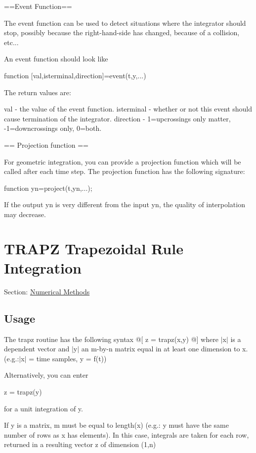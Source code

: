 ==Event Function==

The event function can be used to detect situations where the integrator should stop, possibly because the right-\/hand-\/side has changed, because of a collision, etc...

An event function should look like

function \mbox{[}val,isterminal,direction\mbox{]}=event(t,y,...)

The return values are\-:

val -\/ the value of the event function. isterminal -\/ whether or not this event should cause termination of the integrator. direction -\/ 1=upcrossings only matter, -\/1=downcrossings only, 0=both.

== Projection function ==

For geometric integration, you can provide a projection function which will be called after each time step. The projection function has the following signature\-: \begin{DoxyVerb}function yn=project(t,yn,...);
\end{DoxyVerb}


If the output yn is very different from the input yn, the quality of interpolation may decrease. \hypertarget{num_trapz}{}\section{T\-R\-A\-P\-Z Trapezoidal Rule Integration}\label{num_trapz}
Section\-: \hyperlink{sec_num}{Numerical Methods} \hypertarget{vtkwidgets_vtkxyplotwidget_Usage}{}\subsection{Usage}\label{vtkwidgets_vtkxyplotwidget_Usage}
The trapz routine has the following syntax @\mbox{[} z = trapz(x,y) @\mbox{]} where $|$x$|$ is a dependent vector and $|$y$|$ an m-\/by-\/n matrix equal in at least one dimension to x. (e.\-g.\-:$|$x$|$ = time samples, y = f(t))

Alternatively, you can enter \begin{DoxyVerb}     z = trapz(y) 
\end{DoxyVerb}
 for a unit integration of y.

If y is a matrix, m must be equal to length(x) (e.\-g.\-: y must have the same number of rows as x has elements). In this case, integrals are taken for each row, returned in a resulting vector z of dimension (1,n) 